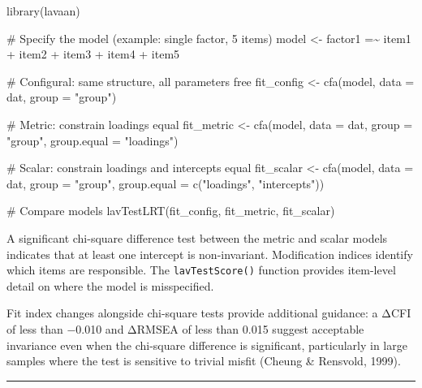 \documentclass[
  11pt,
  letterpaper,
]{scrbook}
\newenvironment{Shaded}{\begin{snugshade}}{\end{snugshade}}
\newcommand{\AttributeTok}[1]{\textcolor[rgb]{0.40,0.45,0.13}{#1}}
\newcommand{\CommentTok}[1]{\textcolor[rgb]{0.37,0.37,0.37}{#1}}
\newcommand{\FunctionTok}[1]{\textcolor[rgb]{0.28,0.35,0.67}{#1}}
\newcommand{\NormalTok}[1]{\textcolor[rgb]{0.00,0.23,0.31}{#1}}
\newcommand{\OtherTok}[1]{\textcolor[rgb]{0.00,0.23,0.31}{#1}}
\newcommand{\StringTok}[1]{\textcolor[rgb]{0.13,0.47,0.30}{#1}}
\begin{document}
\begin{Shaded}
\begin{Highlighting}[]
\FunctionTok{library}\NormalTok{(lavaan)}

\CommentTok{\# Specify the model (example: single factor, 5 items)}
\NormalTok{model }\OtherTok{\textless{}{-}} \StringTok{\textquotesingle{}}
\StringTok{  factor1 =\textasciitilde{} item1 + item2 + item3 + item4 + item5}
\StringTok{\textquotesingle{}}

\CommentTok{\# Configural: same structure, all parameters free}
\NormalTok{fit\_config }\OtherTok{\textless{}{-}} \FunctionTok{cfa}\NormalTok{(model, }\AttributeTok{data =}\NormalTok{ dat, }\AttributeTok{group =} \StringTok{"group"}\NormalTok{)}

\CommentTok{\# Metric: constrain loadings equal}
\NormalTok{fit\_metric }\OtherTok{\textless{}{-}} \FunctionTok{cfa}\NormalTok{(model, }\AttributeTok{data =}\NormalTok{ dat, }\AttributeTok{group =} \StringTok{"group"}\NormalTok{,}
                  \AttributeTok{group.equal =} \StringTok{"loadings"}\NormalTok{)}

\CommentTok{\# Scalar: constrain loadings and intercepts equal}
\NormalTok{fit\_scalar }\OtherTok{\textless{}{-}} \FunctionTok{cfa}\NormalTok{(model, }\AttributeTok{data =}\NormalTok{ dat, }\AttributeTok{group =} \StringTok{"group"}\NormalTok{,}
                  \AttributeTok{group.equal =} \FunctionTok{c}\NormalTok{(}\StringTok{"loadings"}\NormalTok{, }\StringTok{"intercepts"}\NormalTok{))}

\CommentTok{\# Compare models}
\FunctionTok{lavTestLRT}\NormalTok{(fit\_config, fit\_metric, fit\_scalar)}
\end{Highlighting}
\end{Shaded}

A significant chi-square difference test between the metric and scalar
models indicates that at least one intercept is non-invariant.
Modification indices identify which items are responsible. The
\texttt{lavTestScore()} function provides item-level detail on where the
model is misspecified.

Fit index changes alongside chi-square tests provide additional
guidance: a ΔCFI of less than −0.010 and ΔRMSEA of less than 0.015
suggest acceptable invariance even when the chi-square difference is
significant, particularly in large samples where the test is sensitive
to trivial misfit (Cheung \& Rensvold, 1999).

\begin{center}\rule{0.5\linewidth}{0.5pt}\end{center}
\end{document}
